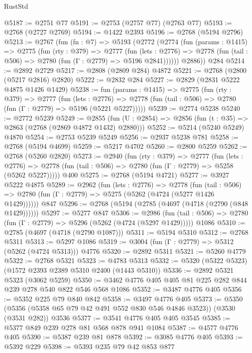 \begin{lexlean}{RustStd}
\begin{coremodule}
@5187 := @2751 @77
@5191 := @2753 (@2757 @77) (@2763 @77)
@5193 := @2768 (@2727 @2769)
@5194 := @1422 @2393
@5196 := @2768 (@5194 @2796)
@5213 := @2767
    (fun (fn : @7) =>
    @5193
      (@2772
        (@2774
          (fun (params : @1415) =>
          @2775
            (fun (rty : @379) =>
            @2777
              (fun (lets : @2776) =>
              @2778 (fun (tail : @506) => @2780 (fun (Γ : @2779) => @5196 @2841))))))
        @2886))
    @284
@5214 := @2892 @2729
@5217 := @2808 (@2809 @284) @4872
@5221 := @2768 (@2800 (@5217 @2816) @2820)
@5222 := @2832 @284
@5227 := @2829 (@2831 @5222 @4875 @1426 @1429)
@5238 := fun (params : @1415) =>
  @2775
    (fun (rty : @379) =>
    @2777
      (fun (lets : @2776) =>
      @2778 (fun (tail : @506) => @2780 (fun (Γ : @2779) => @5196 (@5221 @5227)))))
@5239 := @2774 @5238
@5240 := @2772 @5239
@5249 := @2855 (fun (U : @2854) => @2856 (fun (t : @35) => @2863 (@2768 (@2869 @4872 @1432) @2880)))
@5252 := @5214 (@5240 @5249) @4870
@5254 := @2753 @5239 @5249
@5256 := @2937 @5238 @781
@5258 := @2768 (@5194 @4699)
@5259 := @5217 @4702
@5260 := @2800 @5259
@5262 := @2768 (@5260 @2820)
@5273 := @2940
    (fun (rty : @379) =>
    @2777
      (fun (lets : @2776) =>
      @2778 (fun (tail : @506) => @2780 (fun (Γ : @2779) => @5258 (@5262 @5227)))))
    @400
@5275 := @2768 (@5194 @4721)
@5277 := @3927 @5222 @4875
@5289 := @2962
    (fun (lets : @2776) =>
    @2778
      (fun (tail : @506) => @2780 (fun (Γ : @2779) => @5275 (@5262 (@4724 (@5277 @1426 @1429))))))
    @847
@5296 := @2768 (@5194 (@2785 (@4697 (@4718 (@2790 (@848 @1429))))))
@5297 := @5277 @847
@5306 := @2986
    (fun (tail : @506) => @2780 (fun (Γ : @2779) => @5296 (@5262 (@4724 (@5297 @1429)))))
    @1086
@5310 := @2785 (@4697 (@4718 (@2790 @1087)))
@5311 := @5194 @5310
@5312 := @2768 @5311
@5313 := @5297 @1086
@5319 := @3004 (fun (Γ : @2779) => @5312 (@5262 (@4724 @5313))) @4776
@5320 := @2892 @5311
@5321 := @5260 @4779
@5322 := @2768 @5321
@5323 := @4783 @5313
@5332 := @5320 (@5322 @5323) (@1572 @2393 @2389 @5310 @2400 (@1443 @5310))
@5336 := @2892 @5321 @5323 (@3062 @5259)
@5350 := @3462 @4776 @405 @405 @81 @225 @282 @844 @239 @278 @540 @822 @546 @568 @1086
@5352 := @3487 @4776 @405
@5356 := @5352 @225 @79 @840 @842
@5358 := @3497 @4776 @405
@5373 := @5350
    (@5356 (@5358 @65 @79 @42 @491 @552 @830 @546 @4846 @3523))
    (@3530 (@3531 @282))
    @3536
@5377 := @3541 @4776 @405 @405 @3545
@5385 := @5377 @849 @239 @278 @81 @568 @878 @941 @1084
@5387 := @4577 @4776 @405
@5390 := @5387 @239 @81 @878
@5392 := @3085 @4776 @405
@5393 := @5392 @229
@5398 := @5393 @235 @79 @42 @853 @877

\end{coremodule}
\end{lexlean}
